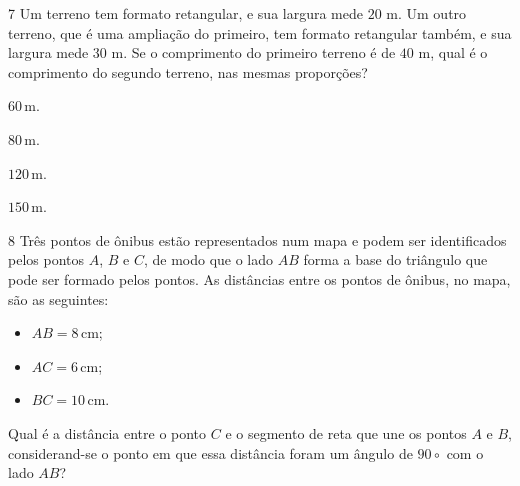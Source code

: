 \num{7} Um terreno tem formato retangular, e sua largura mede $20$ m. Um outro
terreno, que é uma ampliação do primeiro, tem formato retangular também,
e sua largura mede $30$ m. Se o comprimento do primeiro terreno é de $40$ m,
qual é o comprimento do segundo terreno, nas mesmas proporções?

\begin{escolha}
\item $60\,\text{m}$.
\item $80\,\text{m}$.
\item $120\,\text{m}$.
\item $150\,\text{m}$.
\end{escolha}



\num{8} Três pontos de ônibus estão representados num mapa e podem ser
identificados pelos pontos $A$, $B$ e $C$, de modo que o lado $AB$ forma
a base do triângulo que pode ser formado pelos pontos. As distâncias entre
os pontos de ônibus, no mapa, são as seguintes:

\begin{itemize}
  \item $AB = 8\,\text{cm}$;
  \item $AC = 6\,\text{cm}$;
  \item $BC = 10\,\text{cm}$.
\end{itemize}

Qual é a distância entre o ponto $C$ e o segmento de reta que une os pontos
$A$ e $B$, considerand-se o ponto em que essa distância foram um ângulo de
$90\circ$ com o lado $AB$?


